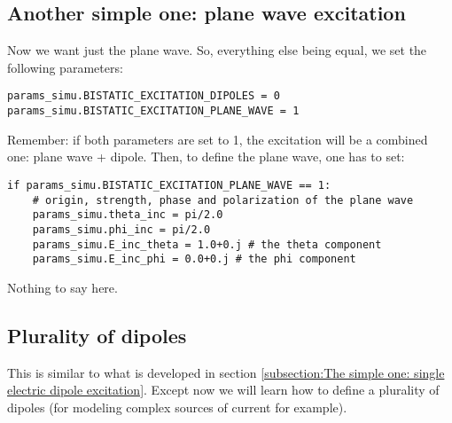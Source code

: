 \documentclass[a4paper,10pt]{book}
\begin{document}
\subsection{Another simple one: plane wave excitation}
%
\par
Now we want just the plane wave. So, everything else being equal, we set the following parameters:
\begin{verbatim}
params_simu.BISTATIC_EXCITATION_DIPOLES = 0
params_simu.BISTATIC_EXCITATION_PLANE_WAVE = 1
\end{verbatim}
Remember: if both parameters are set to 1, the excitation will be a combined one: plane wave + dipole. Then, to define the plane wave, one has to set:
\begin{verbatim}
if params_simu.BISTATIC_EXCITATION_PLANE_WAVE == 1:
    # origin, strength, phase and polarization of the plane wave
    params_simu.theta_inc = pi/2.0
    params_simu.phi_inc = pi/2.0
    params_simu.E_inc_theta = 1.0+0.j # the theta component
    params_simu.E_inc_phi = 0.0+0.j # the phi component
\end{verbatim}
Nothing to say here.

\subsection{Plurality of dipoles}
%
\par
This is similar to what is developed in section \ref{subsection:The simple one: single electric dipole excitation}. Except now we will learn how to define a plurality of dipoles (for modeling complex sources of current for example).
\end{document}
